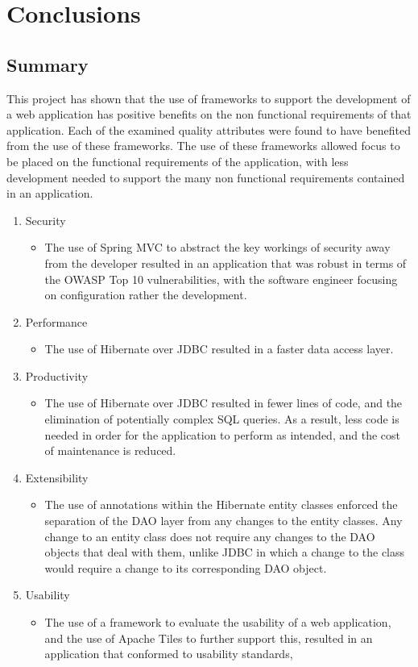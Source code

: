 \chapter{Conclusions}
\label{conclusion}

\section{Summary}

This project has shown that the use of frameworks to support the development of a web application has positive benefits on the non functional requirements of that application. Each of the examined quality attributes were found to have benefited from the use of these frameworks. The use of these frameworks allowed focus to be placed on the functional requirements of the application, with less development needed to support the many non functional requirements contained in an application. 

\begin{enumerate}
\item Security
\begin{itemize}
\item The use of Spring MVC to abstract the key workings of security away from the developer resulted in an application that was robust in terms of the OWASP Top 10 vulnerabilities, with the software engineer focusing on configuration rather the development.
\end{itemize}
\item Performance
\begin{itemize}
\item The use of Hibernate over JDBC resulted in a faster data access layer. 
\end{itemize}
\item Productivity
\begin{itemize}
\item The use of Hibernate over JDBC resulted in fewer lines of code, and the elimination of potentially complex SQL queries. As a result, less code is needed in order for the application to perform as intended, and the cost of maintenance is reduced.
\end{itemize}
\item Extensibility
\begin{itemize}
\item The use of annotations within the Hibernate entity classes enforced the separation of the DAO layer from any changes to the entity classes. Any change to an entity class does not require any changes to the DAO objects that deal with them, unlike JDBC in which a change to the class would require a change to its corresponding DAO object. 
\end{itemize}
\item Usability
\begin{itemize}
\item The use of a framework to evaluate the usability of a web application, and the use of Apache Tiles to further support this, resulted in an application that conformed to usability standards,
\end{itemize}
\end{enumerate}

